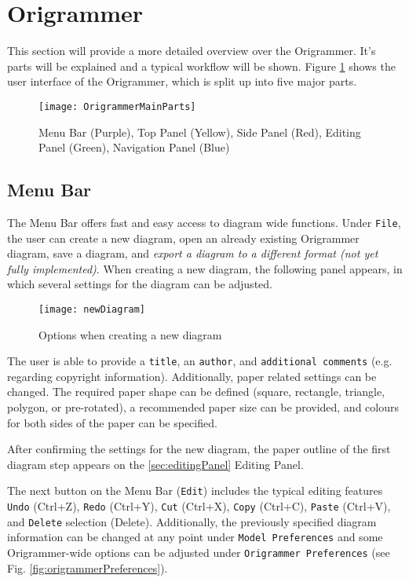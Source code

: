 
\section{Origrammer}
\label{sec:origrammer}

This section will provide a more detailed overview over the Origrammer. It's parts will be explained and a typical workflow will be shown. Figure \ref{fig:origrammerMain} shows the user interface of the Origrammer, which is split up into five major parts.

\begin{figure}[htbp]
	\centering
	\texttt{[image: OrigrammerMainParts]}
	\caption{Menu Bar (Purple), Top Panel (Yellow), Side Panel (Red), Editing Panel (Green), Navigation Panel (Blue)}
	\label{fig:origrammerMain}
\end{figure}

\subsection{Menu Bar}

The Menu Bar offers fast and easy access to diagram wide functions. Under \texttt{File}, the user can create a new diagram, open an already existing Origrammer diagram, save a diagram, and \emph{export a diagram to a different format (not yet fully implemented)}. When creating a new diagram, the following panel appears, in which several settings for the diagram can be adjusted.

\begin{figure}[htbp]
	\centering
	\texttt{[image: newDiagram]}
	\caption{Options when creating a new diagram}
	\label{fig:newDiagram}
\end{figure}

\newpage
The user is able to provide a \texttt{title}, an \texttt{author}, and \texttt{additional comments} (e.g. regarding copyright information). Additionally, paper related settings can be changed. The required paper shape can be defined (square, rectangle, triangle, polygon, or pre-rotated), a recommended paper size can be provided, and colours for both sides of the paper can be specified.

After confirming the settings for the new diagram, the paper outline of the first diagram step appears on the \ref{sec:editingPanel} Editing Panel.

The next button on the Menu Bar (\texttt{Edit}) includes the typical editing features \texttt{Undo} (Ctrl+Z), \texttt{Redo} (Ctrl+Y), \texttt{Cut} (Ctrl+X), \texttt{Copy} (Ctrl+C), \texttt{Paste} (Ctrl+V), and \texttt{Delete} selection (Delete). Additionally, the previously specified diagram information can be changed at any point under \texttt{Model Preferences} and some Origrammer-wide options can be adjusted under \texttt{Origrammer Preferences} (see Fig. \ref{fig:origrammerPreferences}).

